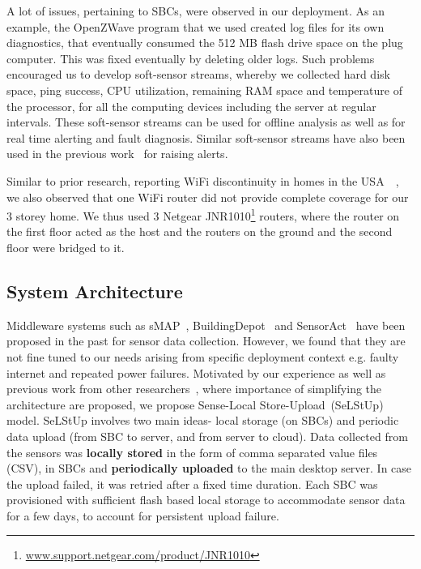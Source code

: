 \documentclass[10pt]{sensys-proc}
\newcommand{\secref}[1]{Section~\ref{#1}}
\newcommand{\selstup}{SeLStUp}
\newcommand{\paradigms}{Sense-Local Store-Upload~}
\newcommand{\selstups}{SeLStUp }
\begin{document}


A lot of issues, pertaining to SBCs, were observed in our deployment. As an example, the OpenZWave program that we used created log files for its own diagnostics, that eventually consumed the 512 MB flash drive space on the plug computer. This was fixed eventually by deleting older logs. Such problems encouraged us to develop soft-sensor streams, whereby we collected hard disk space, ping success, CPU utilization, remaining RAM space and temperature of the processor, for all the computing devices including the server at regular intervals. These soft-sensor streams can be used for offline analysis as well as for real time alerting and fault diagnosis. Similar soft-sensor streams have also been used in the previous work~\cite{hitchhiker_residential} for raising alerts.

Similar to prior research, reporting WiFi discontinuity in homes in the USA~~\cite{hitchhiker_residential}, we also observed that one WiFi router did not provide complete coverage for our 3 storey home. We thus used 3 Netgear JNR1010\footnote{\url{www.support.netgear.com/product/JNR1010}} routers, where the router on the first floor acted as the host and the routers on the ground and the second floor were bridged to it. %


\subsection{System Architecture}	
\label{sec:architecture}
Middleware systems such as sMAP~\cite{smap}, BuildingDepot~\cite{buildingdepot} and SensorAct~\cite{Arjunan12} have been proposed in the past for sensor data collection. However, we found that they are not fine tuned to our needs arising from specific deployment context e.g. faulty internet and repeated power failures. Motivated by our experience as well as previous work from other researchers~\cite{hitchhiker_residential}, where importance of simplifying the architecture are proposed, we propose \paradigms (\selstup) model. \selstups involves two main ideas- local storage (on SBCs) and periodic data upload (from SBC to server, and from server to cloud). Data collected from the sensors was \textbf{locally stored} in the form of comma separated value files (CSV), in SBCs and \textbf{periodically uploaded} to the main desktop server. In case the upload failed, it was retried after a fixed time duration. Each SBC was provisioned with sufficient flash based local storage to accommodate sensor data for a few days, to account for persistent upload failure.
\end{document}
